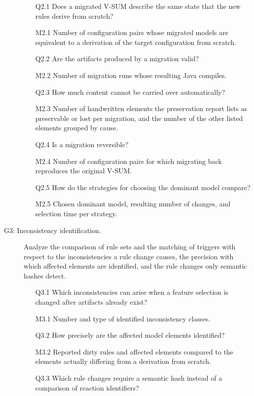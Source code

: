 \begin{description}
\begin{itemize}
                  \item[Q2.1] Does a migrated V-SUM describe the same state that the new rules derive from scratch?
                  \item[M2.1] Number of configuration pairs whose migrated models are equivalent to a derivation of the target configuration from scratch.
                  \item[Q2.2] Are the artifacts produced by a migration valid?
                  \item[M2.2] Number of migration runs whose resulting Java compiles.
                  \item[Q2.3] How much content cannot be carried over automatically?
                  \item[M2.3] Number of handwritten elements the preservation report lists as preservable or lost per migration, and the number of the other listed elements grouped by cause.
                  \item[Q2.4] Is a migration reversible?
                  \item[M2.4] Number of configuration pairs for which migrating back reproduces the original V-SUM.
                  \item[Q2.5] How do the strategies for choosing the dominant model compare?
                  \item[M2.5] Chosen dominant model, resulting number of changes, and selection time per strategy.
            \end{itemize}
      \item[G3: Inconsistency identification.] \label{gqm:G3} Analyze the comparison of rule sets and the matching of triggers with respect to the inconsistencies a rule change causes, the precision with which affected elements are identified, and the rule changes only semantic hashes detect.
            \begin{itemize}
                  \item[Q3.1] Which inconsistencies can arise when a feature selection is changed after artifacts already exist?
                  \item[M3.1] Number and type of identified inconsistency classes.
                  \item[Q3.2] How precisely are the affected model elements identified?
                  \item[M3.2] Reported dirty rules and affected elements compared to the elements actually differing from a derivation from scratch.
                  \item[Q3.3] Which rule changes require a semantic hash instead of a comparison of reaction identifiers?

\end{itemize}
\end{description}
